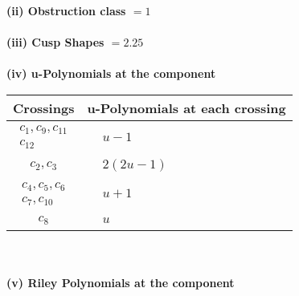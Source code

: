 \documentclass[1p]{elsarticle_modified}
\theoremstyle{definition}
\begin{document}
\flushleft \textbf{(ii) Obstruction class $= 1$}\\~\\
\flushleft \textbf{(iii) Cusp Shapes $= 2.25$}\\~\\
\newpage\renewcommand{\arraystretch}{1}
\flushleft \textbf{(iv) u-Polynomials at the component}\newline \\
\begin{tabular}{m{50pt}|m{274pt}}
Crossings & \hspace{64pt}u-Polynomials at each crossing \\
\hline $$\begin{aligned}c_{1},c_{9},c_{11}\\c_{12}\end{aligned}$$&$\begin{aligned}
&u-1
\end{aligned}$\\
\hline $$\begin{aligned}c_{2},c_{3}\end{aligned}$$&$\begin{aligned}
&2(2 u-1)
\end{aligned}$\\
\hline $$\begin{aligned}c_{4},c_{5},c_{6}\\c_{7},c_{10}\end{aligned}$$&$\begin{aligned}
&u+1
\end{aligned}$\\
\hline $$\begin{aligned}c_{8}\end{aligned}$$&$\begin{aligned}
&u
\end{aligned}$\\
\hline
\end{tabular}\\~\\
\newpage\renewcommand{\arraystretch}{1}
\flushleft \textbf{(v) Riley Polynomials at the component}\newline \\
\end{document}

